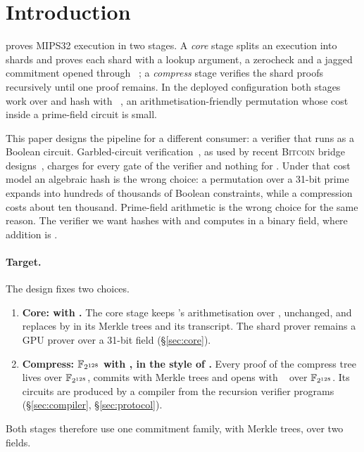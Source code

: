 \section{Introduction}\label{sec:intro}

\Ziren{} proves MIPS32 execution in two stages. A \emph{core} stage splits an execution into shards and proves each shard with a lookup argument, a zerocheck and a jagged commitment opened through \WHIR{}~\citep{whir,jagged-pcs}; a \emph{compress} stage verifies the shard proofs recursively until one proof remains. In the deployed configuration both stages work over \KB{} and hash with \Poseidon{}~\citep{poseidon2}, an arithmetisation-friendly permutation whose cost inside a prime-field circuit is small.

This paper designs the pipeline for a different consumer: a verifier that runs as a Boolean circuit. Garbled-circuit verification~\citep{yao86,free-xor,half-gates}, as used by recent \textsc{Bitcoin} bridge designs~\citep{bitvm,bitvm3,glock}, charges for every \AND{} gate of the verifier and nothing for \XOR{}. Under that cost model an algebraic hash is the wrong choice: a \Poseidon{} permutation over a 31-bit prime expands into hundreds of thousands of Boolean constraints, while a \Blake{} compression~\citep{blake3} costs about ten thousand. Prime-field arithmetic is the wrong choice for the same reason. The verifier we want hashes with \Blake{} and computes in a binary field, where addition is \XOR{}.

\paragraph{Target.} The design fixes two choices.
\begin{enumerate}
  \item \textbf{Core: \KB{} with \Blake{}.} The core stage keeps \Ziren{}'s arithmetisation over \KB{}, unchanged, and replaces \Poseidon{} by \Blake{} in its Merkle trees and its transcript. The shard prover remains a GPU prover over a 31-bit field (\S\ref{sec:core}).
  \item \textbf{Compress: $\mathbb{F}_{2^{128}}$ with \Blake{}, in the style of \Flock{}.} Every proof of the compress tree lives over $\mathbb{F}_{2^{128}}$, commits with \Blake{} Merkle trees and opens with \WHIR{}~\citep{whir} over $\mathbb{F}_{2^{128}}$. Its circuits are produced by a compiler from the recursion verifier programs (\S\ref{sec:compiler}, \S\ref{sec:protocol}).
\end{enumerate}
Both stages therefore use one commitment family, \WHIR{} with \Blake{} Merkle trees, over two fields.

